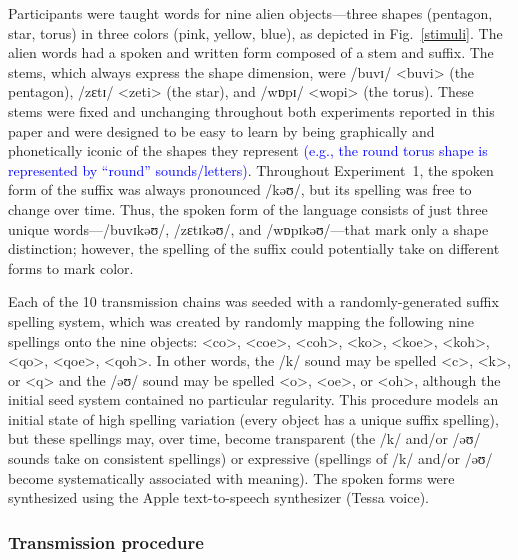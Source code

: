 \documentclass[doc,biblatex]{apa7}
\newcommand\newmaterial[1]{\textcolor{blue}{#1}}
\begin{document}
Participants were taught words for nine alien objects---three shapes (pentagon, star, torus) in three colors (pink, yellow, blue), as depicted in Fig.~\ref{stimuli}. The alien words had a spoken and written form composed of a stem and suffix. The stems, which always express the shape dimension, were /buvɪ/ <buvi> (the pentagon), /zɛtɪ/ <zeti> (the star), and /wɒpɪ/ <wopi> (the torus). These stems were fixed and unchanging throughout both experiments reported in this paper and were designed to be easy to learn by being graphically and phonetically iconic of the shapes they represent \newmaterial{(e.g., the round torus shape is represented by ``round'' sounds/letters)}. Throughout Experiment~1, the spoken form of the suffix was always pronounced /kəʊ/, but its spelling was free to change over time. Thus, the spoken form of the language consists of just three unique words---/buvɪkəʊ/, /zɛtɪkəʊ/, and /wɒpɪkəʊ/---that mark only a shape distinction; however, the spelling of the suffix could potentially take on different forms to mark color.

Each of the 10 transmission chains was seeded with a randomly-generated suffix spelling system, which was created by randomly mapping the following nine spellings onto the nine objects: <co>, <coe>, <coh>, <ko>, <koe>, <koh>, <qo>, <qoe>, <qoh>. In other words, the /k/ sound may be spelled <c>, <k>, or <q> and the /əʊ/ sound may be spelled <o>, <oe>, or <oh>, although the initial seed system contained no particular regularity. This procedure models an initial state of high spelling variation (every object has a unique suffix spelling), but these spellings may, over time, become transparent (the /k/ and/or /əʊ/ sounds take on consistent spellings) or expressive (spellings of /k/ and/or /əʊ/ become systematically associated with meaning). The spoken forms were synthesized using the Apple text-to-speech synthesizer (Tessa voice).

\subsubsection{Transmission procedure}
\end{document}
